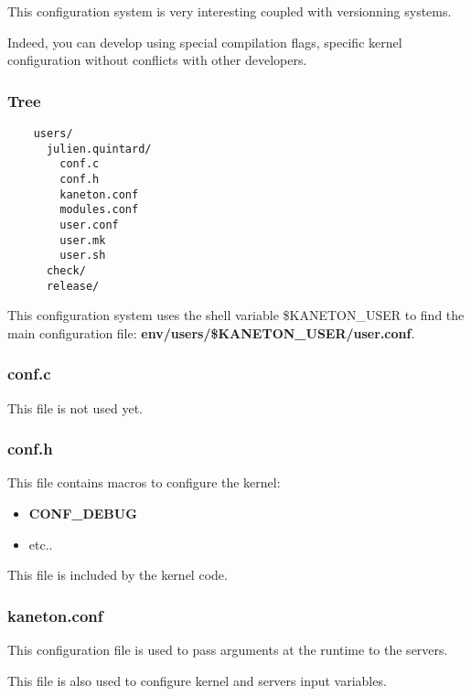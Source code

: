 {\begin{frame}
  \nl

  This configuration system is very interesting coupled with versionning
  systems.

  \nl

  Indeed, you can develop using special compilation flags, specific kernel
  configuration without conflicts with other developers.
\end{frame}


\begin{frame}[containsverbatim]
  \frametitle{Tree}

  \begin{verbatim}
    users/
      julien.quintard/
        conf.c
        conf.h
        kaneton.conf
        modules.conf
        user.conf
        user.mk
        user.sh
      check/
      release/
  \end{verbatim}

  This configuration system uses the shell variable \$KANETON\_USER to find
  the main configuration file: \textbf{env/users/\$KANETON\_USER/user.conf}.
\end{frame}


\begin{frame}
  \frametitle{conf.c}

  This file is not used yet.
\end{frame}


\begin{frame}
  \frametitle{conf.h}

  This file contains macros to configure the kernel:

  \begin{itemize}
    \item
      \textbf{CONF\_DEBUG}
    \item
      etc..
  \end{itemize}

  \nl

  This file is included by the kernel code.
\end{frame}


\begin{frame}
  \frametitle{kaneton.conf}

  This configuration file is used to pass arguments at the runtime to the
  servers.

  \nl

  This file is also used to configure kernel and servers input variables.
\end{frame}

}
